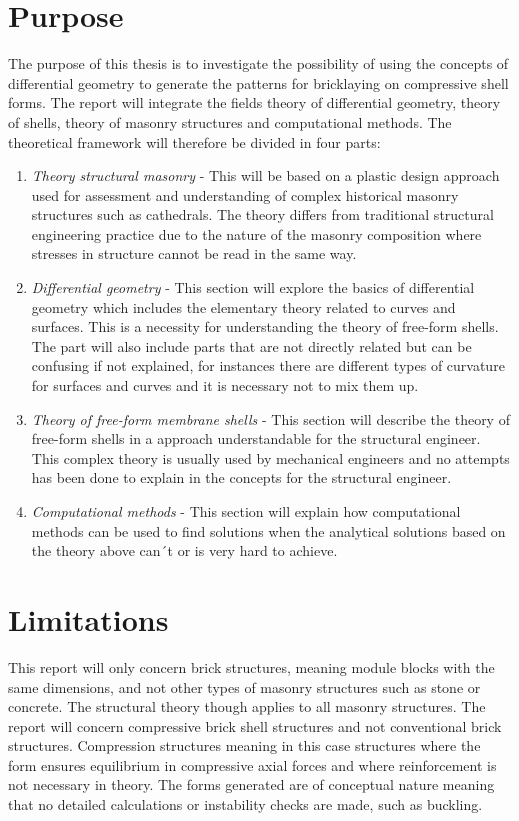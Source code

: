 \section{Purpose} 
The  purpose of this thesis is to investigate the possibility of using the concepts of differential geometry to generate the patterns for bricklaying on compressive shell forms. The report will integrate the fields theory of differential geometry, theory of shells, theory of masonry structures and computational methods. The theoretical framework will therefore be divided in four parts:\\
\begin{enumerate}
    \item \textit{Theory structural masonry} - This will be based on a plastic design approach used for assessment and understanding of complex historical masonry structures such as cathedrals. The theory differs from traditional structural engineering practice due to the nature of the masonry composition where stresses in structure cannot be read in the same way.   
    \item \textit{Differential geometry} - This section will explore the basics of differential geometry which includes the elementary theory related to curves and surfaces. This is a necessity for understanding the theory of free-form shells. The part will also include parts that are not directly related but can be confusing if not explained, for instances there are different types of curvature for surfaces and curves and it is necessary not to mix them up.
    \item \textit{Theory of free-form membrane shells} - This section will describe the theory of free-form shells in a approach understandable for the structural engineer. This complex theory is usually used by mechanical engineers and no attempts has been done to explain in the concepts for the structural engineer.
    \item \textit{Computational methods} - This section will explain how computational methods can be used to find solutions when the analytical solutions based on the theory above can´t or is very hard to achieve.
\end{enumerate}


\section{Limitations} \label{Section_ref}

This report will only concern brick structures, meaning module blocks with the same dimensions, and not other types of masonry structures such as stone or concrete. The structural theory though applies to all masonry structures. The report will concern compressive brick shell structures and not conventional brick structures. Compression structures meaning in this case structures where the form ensures equilibrium in compressive axial forces and where reinforcement is not necessary in theory. The forms generated are of conceptual nature meaning that no detailed calculations or instability checks are made, such as buckling. \\ 

